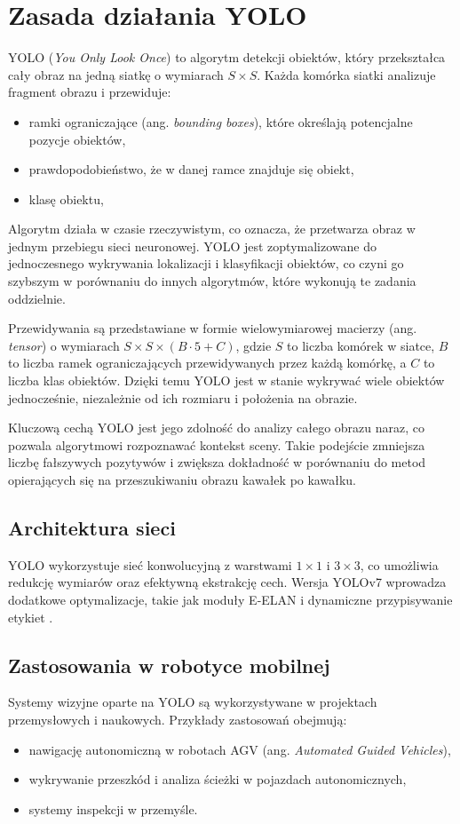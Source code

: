 \documentclass[a4paper,twoside,12pt]{book}
\begin{document}
\section{Zasada działania YOLO}
YOLO (\textit{You Only Look Once}) to algorytm detekcji obiektów, który przekształca cały obraz na jedną siatkę o wymiarach \( S \times S \). Każda komórka siatki analizuje fragment obrazu i przewiduje:
\begin{itemize}
    \item ramki ograniczające (ang. \textit{bounding boxes}), które określają potencjalne pozycje obiektów,
    \item prawdopodobieństwo, że w danej ramce znajduje się obiekt,
    \item klasę obiektu,
\end{itemize}

Algorytm działa w czasie rzeczywistym, co oznacza, że przetwarza obraz w jednym przebiegu sieci neuronowej. YOLO jest zoptymalizowane do jednoczesnego wykrywania lokalizacji i klasyfikacji obiektów, co czyni go szybszym w porównaniu do innych algorytmów, które wykonują te zadania oddzielnie.

Przewidywania są przedstawiane w formie wielowymiarowej macierzy (ang. \textit{tensor}) o wymiarach \( S \times S \times (B \cdot 5 + C) \), gdzie \( S \) to liczba komórek w siatce, \( B \) to liczba ramek ograniczających przewidywanych przez każdą komórkę, a \( C \) to liczba klas obiektów. Dzięki temu YOLO jest w stanie wykrywać wiele obiektów jednocześnie, niezależnie od ich rozmiaru i położenia na obrazie.

Kluczową cechą YOLO jest jego zdolność do analizy całego obrazu naraz, co pozwala algorytmowi rozpoznawać kontekst sceny. Takie podejście zmniejsza liczbę fałszywych pozytywów i zwiększa dokładność w porównaniu do metod opierających się na przeszukiwaniu obrazu kawałek po kawałku.

\subsection{Architektura sieci}
YOLO wykorzystuje sieć konwolucyjną z warstwami \( 1 \times 1 \) i \( 3 \times 3 \), co umożliwia redukcję wymiarów oraz efektywną ekstrakcję cech. Wersja YOLOv7 wprowadza dodatkowe optymalizacje, takie jak moduły E-ELAN i dynamiczne przypisywanie etykiet \cite{bib:wang_yolov7}.

\subsection{Zastosowania w robotyce mobilnej}
Systemy wizyjne oparte na YOLO są wykorzystywane w projektach przemysłowych i naukowych. Przykłady zastosowań obejmują:
\begin{itemize}
    \item nawigację autonomiczną w robotach AGV (ang. \textit{Automated Guided Vehicles}),
    \item wykrywanie przeszkód i analiza ścieżki w pojazdach autonomicznych,
    \item systemy inspekcji w przemyśle.
\end{itemize}
\end{document}
